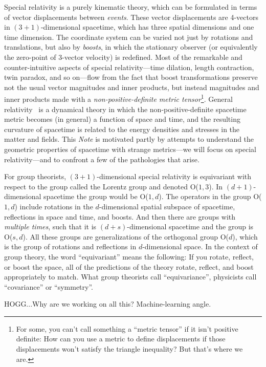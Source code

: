 \documentclass{article}
\newcommand{\plus}{\!+\!} %
\newcommand{\documentname}{\textsl{Note}}
\begin{document}
Special relativity \cite{sr} is a purely kinematic theory, which can be formulated in terms of vector displacements between \emph{events}.
These vector displacements are 4-vectors in $(3\plus1)$-dimensional spacetime, which has three spatial dimensions and one time dimension.
The coordinate system can be varied not just by rotations and translations, but also by \emph{boosts}, in which the stationary observer (or equivalently the zero-point of 3-vector velocity) is redefined.
Most of the remarkable and counter-intuitive aspects of special relativity---time dilation, length contraction, twin paradox, and so on---flow from the fact that boost transformations preserve not the usual vector magnitudes and inner products, but instead magnitudes and inner products made with a \emph{non-positive-definite metric tensor}\footnote{For some, you can't call something a ``metric tensor'' if it isn't positive definite: How can you use a metric to define displacements if those displacements won't satisfy the triangle inequality? But that's where we are.}.
General relativity~\cite{gr} is a dynamical theory in which the non-positive-definite spacetime metric becomes (in general) a function of space and time, and the resulting curvature of spacetime is related to the energy densities and stresses in the matter and fields.
This \documentname{} is motivated partly by attempts to understand the geometric properties of spacetime with strange metrics---we will focus on special relativity---and to confront a few of the pathologies that arise.

For group theorists, $(3\plus1)$-dimensional special relativity is equivariant with respect to the group called the Lorentz group and denoted O($1,3$).
In $(d\plus1)$-dimensional spacetime the group would be O($1,d$).
The operators in the group O($1,d$) include rotations in the $d$-dimensional spatial subspace of spacetime, reflections in space and time, and boosts.
And then there are groups with \emph{multiple times}, such that it is $(d\plus s)$-dimensional spacetime and the group is O($s,d$).
All these groups are generalizations of the orthogonal group O($d$), which is the group of rotations and reflections in $d$-dimensional space.
In the context of group theory, the word ``equivariant'' means the following:
If you rotate, reflect, or boost the space, all of the predictions of the theory rotate, reflect, and boost appropriately to match.
What group theorists call ``equivariance'', physicists call ``covariance'' or ``symmetry''.

HOGG...Why are we working on all this? Machine-learning angle.
\end{document}
